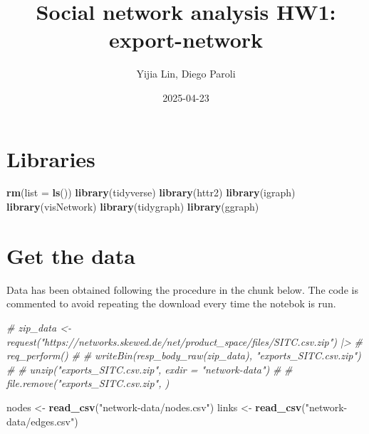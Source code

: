 \documentclass[
]{article}
\title{Social network analysis HW1: export-network}
\author{Yijia Lin, Diego Paroli}
\date{2025-04-23}
\newenvironment{Shaded}{\begin{snugshade}}{\end{snugshade}}
\newcommand{\AttributeTok}[1]{\textcolor[rgb]{0.13,0.29,0.53}{#1}}
\newcommand{\CommentTok}[1]{\textcolor[rgb]{0.56,0.35,0.01}{\textit{#1}}}
\newcommand{\FunctionTok}[1]{\textcolor[rgb]{0.13,0.29,0.53}{\textbf{#1}}}
\newcommand{\NormalTok}[1]{#1}
\newcommand{\OtherTok}[1]{\textcolor[rgb]{0.56,0.35,0.01}{#1}}
\newcommand{\StringTok}[1]{\textcolor[rgb]{0.31,0.60,0.02}{#1}}
\begin{document}
\maketitle

\section{Libraries}\label{libraries}

\begin{Shaded}
\begin{Highlighting}[]
\FunctionTok{rm}\NormalTok{(}\AttributeTok{list =} \FunctionTok{ls}\NormalTok{())}
\FunctionTok{library}\NormalTok{(tidyverse)}
\FunctionTok{library}\NormalTok{(httr2)}
\FunctionTok{library}\NormalTok{(igraph)}
\FunctionTok{library}\NormalTok{(visNetwork)}
\FunctionTok{library}\NormalTok{(tidygraph)}
\FunctionTok{library}\NormalTok{(ggraph)}
\end{Highlighting}
\end{Shaded}

\section{Get the data}\label{get-the-data}

Data has been obtained following the procedure in the chunk below. The
code is commented to avoid repeating the download every time the notebok
is run.

\begin{Shaded}
\begin{Highlighting}[]
\CommentTok{\# zip\_data \textless{}{-} request("https://networks.skewed.de/net/product\_space/files/SITC.csv.zip") |\textgreater{}}
\CommentTok{\#   req\_perform()}
\CommentTok{\# }
\CommentTok{\# writeBin(resp\_body\_raw(zip\_data), "exports\_SITC.csv.zip")}
\CommentTok{\# }
\CommentTok{\# unzip("exports\_SITC.csv.zip", exdir = "network{-}data")}
\CommentTok{\# }
\CommentTok{\# file.remove("exports\_SITC.csv.zip", )}
\end{Highlighting}
\end{Shaded}

\begin{Shaded}
\begin{Highlighting}[]
\NormalTok{nodes }\OtherTok{\textless{}{-}} \FunctionTok{read\_csv}\NormalTok{(}\StringTok{"network{-}data/nodes.csv"}\NormalTok{)}
\NormalTok{links }\OtherTok{\textless{}{-}} \FunctionTok{read\_csv}\NormalTok{(}\StringTok{"network{-}data/edges.csv"}\NormalTok{)}
\end{Highlighting}
\end{Shaded}
\end{document}
